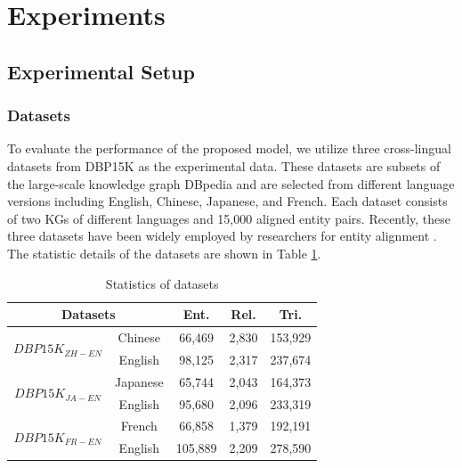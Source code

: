 \documentclass[letterpaper]{article} %
\begin{document}
\section{Experiments}

\subsection{Experimental Setup}

\subsubsection{Datasets}

To evaluate the performance of the proposed model, we utilize three
cross-lingual datasets from DBP15K as the experimental data. These
datasets are subsets of the large-scale knowledge graph DBpedia
\cite{lehmann2015dbpedia} and are selected from different language
versions including English, Chinese, Japanese, and French. Each
dataset consists of two KGs of different languages and 15,000
aligned entity pairs. Recently, these three datasets have been
widely employed by researchers for entity alignment
\cite{wu2019relation, sun2020knowledge, wu2020neighborhood}. The
statistic details of the datasets are shown in Table \ref{datasets}.

\begin{table}[htb]
\centering \scriptsize
\begin{tabular}{c|c|c|ccc}
\hline \multicolumn{3}{c|}{\textbf{Datasets}}         &
\textbf{Ent.}    & \textbf{Rel.}     & \textbf{Tri.}  \\ \hline
\multicolumn{2}{c|}{\multirow{2}{*}{$DBP15K_{ZH-EN}$}} & Chinese        & 66,469   & 2,830   & 153,929   \\
\multicolumn{2}{c|}{}                       & English        &
98,125   & 2,317   & 237,674   \\ \hline
\multicolumn{2}{c|}{\multirow{2}{*}{$DBP15K_{JA-EN}$}} & Japanese        & 65,744   & 2,043   & 164,373   \\
\multicolumn{2}{c|}{}                       & English        &
95,680   & 2,096   & 233,319   \\ \hline
\multicolumn{2}{c|}{\multirow{2}{*}{$DBP15K_{FR-EN}$}} & French        & 66,858   & 1,379   & 192,191   \\
\multicolumn{2}{c|}{}                       & English        &
105,889   & 2,209   & 278,590  \\ \hline
\end{tabular}
\caption{Statistics of datasets} \label{datasets}
\end{table}
\end{document}
